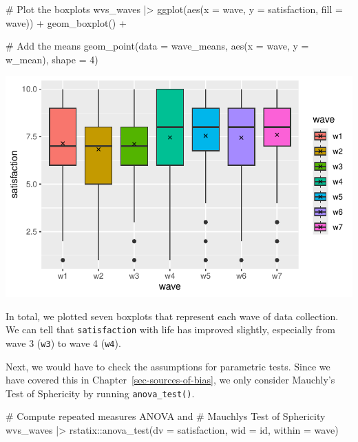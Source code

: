 \documentclass[
  letterpaper,
]{krantz}
\makeatletter
\newenvironment{Shaded}{\begin{snugshade}}{\end{snugshade}}
\newcommand{\AttributeTok}[1]{\textcolor[rgb]{0.40,0.45,0.13}{#1}}
\newcommand{\CommentTok}[1]{\textcolor[rgb]{0.37,0.37,0.37}{#1}}
\newcommand{\DecValTok}[1]{\textcolor[rgb]{0.68,0.00,0.00}{#1}}
\newcommand{\FunctionTok}[1]{\textcolor[rgb]{0.28,0.35,0.67}{#1}}
\newcommand{\NormalTok}[1]{\textcolor[rgb]{0.00,0.23,0.31}{#1}}
\newcommand{\SpecialCharTok}[1]{\textcolor[rgb]{0.37,0.37,0.37}{#1}}
\newenvironment{kframe}{%
\medskip{}
\setlength{\fboxsep}{.8em}
 \def\at@end@of@kframe{}%
 \ifinner\ifhmode%
  \def\at@end@of@kframe{\end{minipage}}%
  \begin{minipage}{\columnwidth}%
 \fi\fi%
 \def\FrameCommand##1{\hskip\@totalleftmargin \hskip-\fboxsep
 \colorbox{shadecolor}{##1}\hskip-\fboxsep
     \hskip-\linewidth \hskip-\@totalleftmargin \hskip\columnwidth}%
 \MakeFramed {\advance\hsize-\width
   \@totalleftmargin\z@ \linewidth\hsize
   \@setminipage}}%
 {\par\unskip\endMakeFramed%
 \at@end@of@kframe}
\renewenvironment{Shaded}{\begin{kframe}}{\end{kframe}}
\makeatother
\begin{document}
\begin{Shaded}
\begin{Highlighting}[]
\CommentTok{\# Plot the boxplots}
\NormalTok{wvs\_waves }\SpecialCharTok{|\textgreater{}}
  \FunctionTok{ggplot}\NormalTok{(}\FunctionTok{aes}\NormalTok{(}\AttributeTok{x =}\NormalTok{ wave,}
             \AttributeTok{y =}\NormalTok{ satisfaction,}
             \AttributeTok{fill =}\NormalTok{ wave)) }\SpecialCharTok{+}
  \FunctionTok{geom\_boxplot}\NormalTok{() }\SpecialCharTok{+}

  \CommentTok{\# Add the means}
  \FunctionTok{geom\_point}\NormalTok{(}\AttributeTok{data =}\NormalTok{ wave\_means,}
             \FunctionTok{aes}\NormalTok{(}\AttributeTok{x =}\NormalTok{ wave,}
                 \AttributeTok{y =}\NormalTok{ w\_mean),}
             \AttributeTok{shape =} \DecValTok{4}\NormalTok{)}
\end{Highlighting}
\end{Shaded}

\includegraphics{11_group_comparison_files/figure-pdf/multiple-paired-groups-boxplots-1.pdf}

In total, we plotted seven boxplots that represent each wave of data
collection. We can tell that \texttt{satisfaction} with life has
improved slightly, especially from wave 3 (\texttt{w3}) to wave 4
(\texttt{w4}).

Next, we would have to check the assumptions for parametric tests. Since
we have covered this in Chapter~\ref{sec-sources-of-bias}, we only
consider Mauchly's Test of Sphericity by running \texttt{anova\_test()}.

\begin{Shaded}
\begin{Highlighting}[]
\CommentTok{\# Compute repeated measures ANOVA and}
\CommentTok{\# Mauchly\textquotesingle{}s Test of Sphericity}
\NormalTok{wvs\_waves }\SpecialCharTok{|\textgreater{}}
\NormalTok{  rstatix}\SpecialCharTok{::}\FunctionTok{anova\_test}\NormalTok{(}\AttributeTok{dv =}\NormalTok{ satisfaction,}
                      \AttributeTok{wid =}\NormalTok{ id,}
                      \AttributeTok{within =}\NormalTok{ wave)}
\end{Highlighting}
\end{Shaded}
\end{document}
